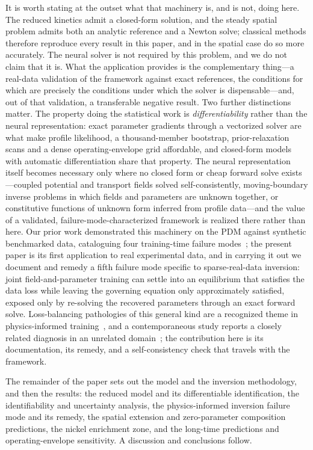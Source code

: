 \documentclass[preprint,12pt]{elsarticle}
\begin{document}
It is worth stating at the outset what that machinery is, and is not,
doing here. The reduced kinetics admit a closed-form solution, and the
steady spatial problem admits both an analytic reference and a Newton
solve; classical methods therefore reproduce every result in this paper,
and in the spatial case do so more accurately. The neural solver is not
required by this problem, and we do not claim that it is. What the
application provides is the complementary thing---a real-data validation
of the framework against exact references, the conditions for which are
precisely the conditions under which the solver is dispensable---and,
out of that validation, a transferable negative result. Two further
distinctions matter. The property doing the statistical work is
\emph{differentiability} rather than the neural representation: exact
parameter gradients through a vectorized solver are what make profile
likelihood, a thousand-member bootstrap, prior-relaxation scans and a
dense operating-envelope grid affordable, and closed-form models with
automatic differentiation share that property. The neural representation
itself becomes necessary only where no closed form or cheap forward solve
exists---coupled potential and transport fields solved
self-consistently, moving-boundary inverse problems in which fields and
parameters are unknown together, or constitutive functions of unknown
form inferred from profile data---and the value of a validated,
failure-mode-characterized framework is realized there rather than here.
Our prior work demonstrated this machinery on the PDM
against synthetic benchmarked data, cataloguing four training-time
failure modes~\citep{farooqi2025pinnpdm}; the present paper is its first
application to real experimental data, and in carrying it out we document
and remedy a fifth failure mode specific to sparse-real-data inversion:
joint field-and-parameter training can settle into an equilibrium that
satisfies the data loss while leaving the governing equation only
approximately satisfied, exposed only by re-solving the recovered
parameters through an exact forward solve. Loss-balancing pathologies of
this general kind are a recognized theme in physics-informed
training~\citep{wang2022ntk,krishnapriyan2021failure}, and a
contemporaneous study reports a closely related diagnosis in an
unrelated domain~\citep{pinnverse2025}; the contribution here is its
documentation, its remedy, and a self-consistency check that travels
with the framework.

The remainder of the paper sets out the model and the inversion
methodology, and then the results: the reduced model and its
differentiable identification, the identifiability and uncertainty
analysis, the physics-informed inversion failure mode and its remedy, the
spatial extension and zero-parameter composition predictions, the nickel
enrichment zone, and the long-time predictions and operating-envelope
sensitivity. A discussion and conclusions follow.
\end{document}
